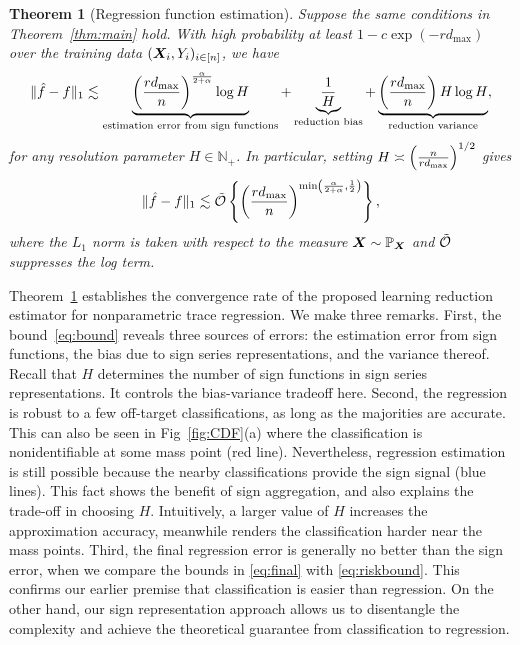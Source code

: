 \documentclass[aos]{imsart}
\newtheorem{theorem}{Theorem}%
\theoremstyle{definition}
\newcommand*{\KeepStyleUnderBrace}[1]{%
\mathop{%
\mathchoice
{\underbrace{\displaystyle#1}}%
{\underbrace{\textstyle#1}}%
{\underbrace{\scriptstyle#1}}%
{\underbrace{\scriptscriptstyle#1}}%
}\limits
}
\begin{document}
\begin{theorem}[Regression function estimation]\label{thm:regression} 
Suppose the same conditions in Theorem~\ref{thm:main} hold. With high probability at least $1-c\exp(-rd_{\max})$ over the training data $(\bm X_i,Y_i)_{i\in[n]}$, we have 
\begin{align}\label{eq:bound}
\onenormSize{}{\hat f-f} \lesssim \KeepStyleUnderBrace{\left({rd_{\max}\over n}\right)^{\alpha \over 2+\alpha}\log H}_{\text{estimation error from sign functions}}+\KeepStyleUnderBrace{1\over H}_{\text{reduction bias}}+\KeepStyleUnderBrace{\left({rd_{\max}\over n}\right)H\log H}_{\text{reduction variance}},
\end{align}
for any resolution parameter $H \in \mathbb{N}_{+}$. In particular, setting $H\asymp \left( {n\over rd_{\max}} \right)^{1/2}$ gives 
\begin{equation}\label{eq:final}
\onenormSize{}{\hat f-f} \lesssim \tilde\tO \left\{ \left({rd_{\max} \over n}\right)^{\min\left({\alpha\over 2+\alpha}, {1\over 2}\right)}\right\},
\end{equation}
where the $L_1$ norm is taken with respect to the measure $\bm X\sim\mathbb{P}_{\bm X}$ and $\tilde {\mathcal{O}}$ suppresses the log term. 
\end{theorem}

\noindent
Theorem~\ref{thm:regression} establishes the convergence rate of the proposed learning reduction estimator for nonparametric trace regression. We make three remarks. First, the bound~\eqref{eq:bound} reveals three sources of errors: the estimation error from sign functions, the bias due to sign series representations, and the variance thereof. Recall that $H$ determines the number of sign functions in sign series representations. It controls the bias-variance tradeoff here. Second, the regression is robust to a few off-target classifications, as long as the majorities are accurate. This can also be seen in Fig~\ref{fig:CDF}(a) where the classification is nonidentifiable at some mass point (red line). Nevertheless, regression estimation is still possible because the nearby classifications provide the sign signal (blue lines). This fact shows the benefit of sign aggregation, and also explains the trade-off in choosing $H$. Intuitively, a larger value of $H$ increases the approximation accuracy, meanwhile renders the classification harder near the mass points. Third, the final regression error is generally no better than the sign error, when we compare the bounds in \eqref{eq:final} with \eqref{eq:riskbound}. This confirms our earlier premise that classification is easier than regression. On the other hand, our sign representation approach allows us to disentangle the complexity and achieve the theoretical guarantee from classification to regression.
\end{document}
